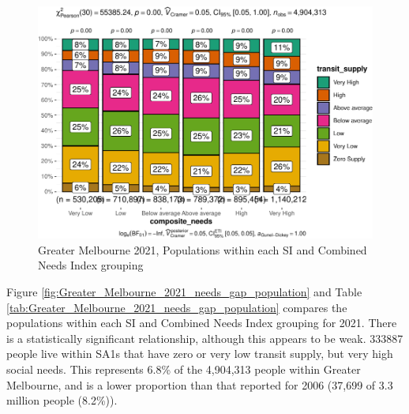\documentclass[preprint, 3p,
authoryear]{elsarticle} %
\begin{document}
\begin{figure}
\centering
\includegraphics{Leveraging_GTFS_to_assess_transit_supply_Transport_Geography_files/figure-latex/Greater_Melbourne_2021_needs_gap_population-1.pdf}
\caption{Greater Melbourne 2021, Populations within each SI and Combined
Needs Index grouping}
\end{figure}

Figure \ref{fig:Greater_Melbourne_2021_needs_gap_population} and Table
\ref{tab:Greater_Melbourne_2021_needs_gap_population} compares the
populations within each SI and Combined Needs Index grouping for 2021.
There is a statistically significant relationship, although this appears
to be weak. 333887 people live within SA1s that have zero or very low
transit supply, but very high social needs. This represents 6.8\% of the
4,904,313 people within Greater Melbourne, and is a lower proportion
than that reported for 2006 (37,699 of 3.3 million people (8.2\%)).
\end{document}
